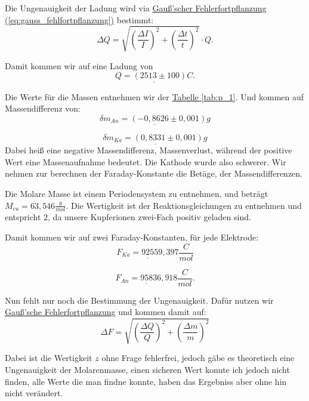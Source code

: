 Die Ungenauigkeit der Ladung wird via \hyperref[eq:gauss_fehlfortpflanzung]{Gauß'scher Fehlerfortpflanzung (\ref*{eq:gauss_fehlfortpflanzung})} bestimmt:
\begin{equation}
    \Delta Q = \sqrt{\left( \frac{\Delta I}{I} \right)^2 + \left( \frac{\Delta t}{t} \right)^2} \cdot Q.
\end{equation}

Damit kommen wir auf eine Ladung von 
\begin{equation}
    \underline{Q = (2513 \pm 100)C}.
\end{equation}

Die Werte für die Massen entnehmen wir der \hyperref[tab:p_1]{Tabelle \ref*{tab:p_1}}. Und kommen auf Massendifferenz von:
\begin{equation}
    \underline{
        \delta m_{An} = (-0,8626 \pm 0,001) g
    }
\end{equation}

\begin{equation}
    \underline{
        \delta m_{Ka} = (0,8331 \pm 0,001) g
    }
\end{equation}
Dabei heiß eine negative Massendifferenz, Massenverlust, während der positive Wert eine Massenaufnahme bedeutet. Die Kathode wurde also schwerer. Wir nehmen zur berechnen der Faraday-Konstante die Betäge, der Massendifferenzen.

Die Molare Masse ist einem Periodensystem \cite{CuMol} zu entnehmen, und beträgt $M_{cu} = 63,546 \frac{g}{mol}$. Die Wertigkeit ist der Reaktionsgleichungen zu entnehmen und entspricht $2$, da unsere Kupferionen zwei-Fach positiv geladen sind.

Damit kommen wir auf zwei Faraday-Konstanten, für jede Elektrode:
\begin{equation}
    \underline{F_{Ka} = 92559,397} \frac{C}{mol}
\end{equation}

\begin{equation}
    \underline{F_{An} = 95836,918} \frac{C}{mol}.
\end{equation}

Nun fehlt nur noch die Bestimmung der Ungenauigkeit. Dafür nutzen wir \hyperref[eq:gauss_fehlfortpflanzung]{Gauß'sche Fehlerfortpflanzung} und kommen damit auf:
\begin{equation}
    \Delta F = \sqrt{\left(\frac{\Delta Q}{Q}\right)^2 + \left(\frac{\Delta m}{m}\right)^2}
\end{equation}

Dabei ist die Wertigkeit $z$ ohne Frage fehlerfrei, jedoch gäbe es theoretisch eine Ungenauigkeit der Molarenmasse, einen sicheren Wert konnte ich jedoch nicht finden,
alle Werte die man findne konnte, haben das Ergebniss aber ohne hin nicht verändert.

